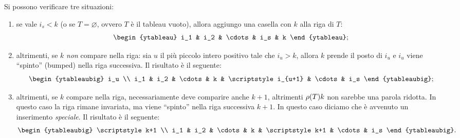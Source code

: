 Si possono verificare tre situazioni:
\begin{enumerate}
    \item \label{item:eg_ins1}
        se vale $i_s < k$ (o se $T=\varnothing$, ovvero $T$ \`e il tableau vuoto),
        allora aggiungo una casella con $k$ alla riga di $T$:
        \[
            \begin{ytableau}
                i_1 & i_2 & \cdots & i_s & k
            \end{ytableau};
        \]
    \item \label{item:eg_ins2} 
        altrimenti, se $k$ \emph{non} compare nella riga: sia $u$ il più piccolo
        intero positivo tale che $i_u > k$, allora $k$ prende il posto di $i_u$ e
        $i_u$ viene ``spinto'' (bumped) nella riga successiva. Il risultato è il seguente:
        \[
            \begin{ytableaubig}
i_u \\
                i_1 & i_2 & \cdots & k & \scriptstyle i_{u+1} & \cdots & i_s 
            \end{ytableaubig};
        \]
    \item \label{item:eg_ins3}
        altrimenti, se $k$ compare nella riga, necessariamente deve comparire anche 
        $k+1$, altrimenti $\operatorname{\rho}(T)k$ non sarebbe una parola ridotta.
        In questo caso la riga rimane invariata, ma viene ``spinto'' nella riga successiva
        $k+1$. In questo caso diciamo che \`e avvenuto un inserimento \emph{speciale}.
        Il risultato \`e il seguente:
        \[
            \begin{ytableaubig}
                \scriptstyle k+1 \\
                i_1 & i_2 & \cdots & k & \scriptstyle k+1 & \cdots & i_s 
            \end{ytableaubig}.
        \]

\end{enumerate}

